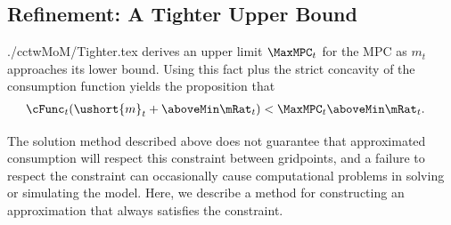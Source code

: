 \documentclass[titlepage]{\econtex}
\begin{document}
\subsection{Refinement: A Tighter Upper Bound}
\begin{verbatimwrite}{./cctwMoM/Tighter.tex}
  \cite{BufferStockTheory} derives an upper limit  $\MaxMPC_{t}$ for the MPC as $m_{t}$
  approaches its lower bound.  Using this 
  fact plus the strict concavity of the consumption function yields the
  proposition that 
  \begin{eqnarray}
    \cFunc_{t}(\ushort{m}_{t}+\aboveMin \mRat_{t}) & < \MaxMPC_{t} \aboveMin \mRat_{t}.
  \end{eqnarray}

  The solution method described above does not guarantee that
  approximated consumption will respect this constraint between gridpoints, and a failure to 
  respect the constraint can occasionally cause computational problems in solving
  or simulating the model.  Here, we 
  describe a method for constructing an approximation that always
  satisfies the constraint.

\end{verbatimwrite}
\end{document}
